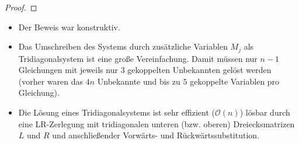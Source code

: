 \documentclass[
]{mycourse}
\begin{document}
\begin{st}
\begin{proof}
	\end{proof}
	\begin{note}
		\begin{itemize}
			\item
				Der Beweis war konstruktiv.
			\item
				Das Umschreiben des Systems durch zusätzliche Variablen $M_j$ als Tridiagonalsystem ist eine große Vereinfachung.
				Damit müssen nur $n-1$ Gleichungen mit jeweils nur $3$ gekoppelten Unbekannten gelöst werden (vorher waren das $4n$ Unbekannte und bis zu $5$ gekoppelte Variablen pro Gleichung).
			\item
				Die Lösung eines Tridiagonalsystems ist sehr effizient ($\mathcal O(n)$) lösbar durch eine LR-Zerlegung mit tridiagonalen unteren (bzw. oberen) Dreiecksmatrizen $L$ und $R$ und anschließender Vorwärts- und Rückwärtssubstitution.
		\end{itemize}
	\end{note}
\end{st}
\end{document}
